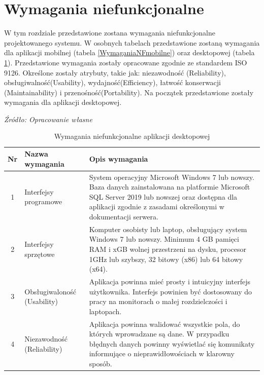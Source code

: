 \documentclass[12pt,oneside]{report}
\begin{document}
\section{Wymagania niefunkcjonalne}
W tym rozdziale przedstawione zostana wymagania niefunkcjonalne projektowanego systemu. W osobnych tabelach przedstawione zostaną wymagania dla aplikacji mobilnej (tabela \ref{WymaganiaNFmobilne}) oraz desktopowej (tabela \ref{WymaganiaNFdesktop}). 
Przedstawione wymagania zostały opracowane zgodnie ze standardem ISO 9126. Określone zostały atrybuty, takie jak: niezawodność (Reliability), obsługiwalność(Usability), wydajność(Efficiency), łatwość konserwacji (Maintainability) i przenośność(Portability). Na początek przedstawione zostały wymagania dla aplikacji desktopowej.
	\begin{table}[H]
	\caption{Wymagania niefunkcjonalne aplikacji desktopowej }
	\textit{Źródło: Opracowanie własne}
	\label{WymaganiaNFdesktop}
	\centering
	\begin{tabular}{|c|p{6cm}|p{8cm}|}
		\hline
		Nr & Nazwa wymagania & Opis wymagania\\
		\hline
		1& Interfejsy programowe& System operacyjny Microsoft Windows 7 lub nowszy. Baza danych zainstalowana na platformie Microsoft SQL Server 2019 lub nowszej oraz dostępna dla aplikacji zgodnie z zasadami określonymi w dokumentacji serwera.\\		
		\hline
		2& Interfejsy sprzętowe& Komputer osobisty lub laptop, obsługujący system Windows 7 lub nowszy. Minimum 4 GB pamięci RAM i xGB wolnej przestrzeni na dysku, procesor 1GHz lub szybszy, 32 bitowy (x86) lub 64 bitowy (x64).\\	
		\hline	
		3& Obsługiwaloność (Usability)& Aplikacja powinna mieć prosty i intuicyjny interfejs użytkownika. Interfejs powinien być dostosowany do pracy na monitorach o małej rozdzielczości i laptopach.\\		
		\hline
		4& Niezawodność (Reliability)& Aplikacja powinna walidować wszystkie pola, do których wprowadzane są dane. W przypadku błędnych danych powinny wyświetlać się komunikaty informujące o nieprawidłowościach w klarowny sposób.\\	
						\hline
	\end{tabular}
\end{table}
\end{document}
